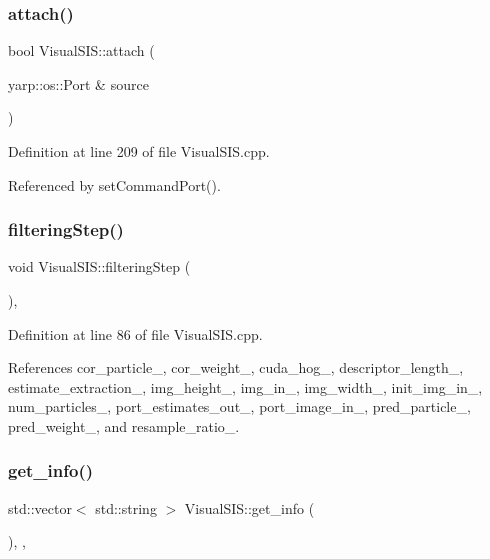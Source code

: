 \subsubsection{\texorpdfstring{attach()}{attach()}}
{\footnotesize\ttfamily bool Visual\+S\+I\+S\+::attach (\begin{DoxyParamCaption}\item[{yarp\+::os\+::\+Port \&}]{source }\end{DoxyParamCaption})\hspace{0.3cm}{\ttfamily [protected]}}



Definition at line 209 of file Visual\+S\+I\+S.\+cpp.



Referenced by set\+Command\+Port().

\mbox{\label{classVisualSIS_a5c1e7ef8000c981db41cad3c6d17a535}} 
\subsubsection{\texorpdfstring{filtering\+Step()}{filteringStep()}}
{\footnotesize\ttfamily void Visual\+S\+I\+S\+::filtering\+Step (\begin{DoxyParamCaption}{ }\end{DoxyParamCaption})\hspace{0.3cm}{\ttfamily [override]}, {\ttfamily [protected]}}



Definition at line 86 of file Visual\+S\+I\+S.\+cpp.



References cor\+\_\+particle\+\_\+, cor\+\_\+weight\+\_\+, cuda\+\_\+hog\+\_\+, descriptor\+\_\+length\+\_\+, estimate\+\_\+extraction\+\_\+, img\+\_\+height\+\_\+, img\+\_\+in\+\_\+, img\+\_\+width\+\_\+, init\+\_\+img\+\_\+in\+\_\+, num\+\_\+particles\+\_\+, port\+\_\+estimates\+\_\+out\+\_\+, port\+\_\+image\+\_\+in\+\_\+, pred\+\_\+particle\+\_\+, pred\+\_\+weight\+\_\+, and resample\+\_\+ratio\+\_\+.

\mbox{\label{classVisualSIS_af1ecb78ecc8c9838c05b7d29c5a9f83a}} 
\subsubsection{\texorpdfstring{get\+\_\+info()}{get\_info()}}
{\footnotesize\ttfamily std\+::vector$<$ std\+::string $>$ Visual\+S\+I\+S\+::get\+\_\+info (\begin{DoxyParamCaption}{ }\end{DoxyParamCaption})\hspace{0.3cm}{\ttfamily [override]}, {\ttfamily [protected]}, {\ttfamily [virtual]}}



